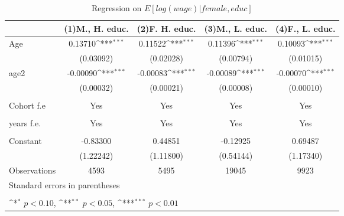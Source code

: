 \begin{table}[htbp]\centering
\def\sym#1{\ifmmode^{#1}\else\(^{#1}\)\fi}
\caption{Regression on \(E[log(wage)|female,educ]\) \label{Tab:reg2}}
\begin{tabular}{l*{4}{c}}
\toprule
                    &\multicolumn{1}{c}{(1)M., H. educ.\label{Reg:2_H_M}}         &\multicolumn{1}{c}{(2)F. H. educ.\label{Reg:2_H_F} }        &\multicolumn{1}{c}{(3)M., L. educ.\label{Reg:2_L_M}}         &\multicolumn{1}{c}{(4)F., L. educ.\label{Reg:2_L_F}}         \\
\midrule
Age                 &     0.13710\sym{***}&     0.11522\sym{***}&     0.11396\sym{***}&     0.10093\sym{***}\\
                    &   (0.03092)         &   (0.02028)         &   (0.00794)         &   (0.01015)         \\
\addlinespace
age2                &    -0.00090\sym{***}&    -0.00083\sym{***}&    -0.00089\sym{***}&    -0.00070\sym{***}\\
                    &   (0.00032)         &   (0.00021)         &   (0.00008)         &   (0.00010)         \\

\\
Cohort f.e           &       Yes        &      Yes &       Yes        &      Yes \\
                            \\
\addlinespace
years f.e.            &       Yes         &       Yes   &       Yes        &      Yes       \\
                           \\
\addlinespace

Constant            &    -0.83300         &     0.44851         &    -0.12925         &     0.69487         \\
                    &   (1.22242)         &   (1.11800)         &   (0.54144)         &   (1.17340)         \\
\midrule
Observations        &        4593         &        5495         &       19045         &        9923         \\
\bottomrule
\multicolumn{5}{l}{\footnotesize Standard errors in parentheses}\\
\multicolumn{5}{l}{\footnotesize }\\
\multicolumn{5}{l}{\footnotesize \sym{*} \(p<0.10\), \sym{**} \(p<0.05\), \sym{***} \(p<0.01\)}\\
\end{tabular}
\end{table}
